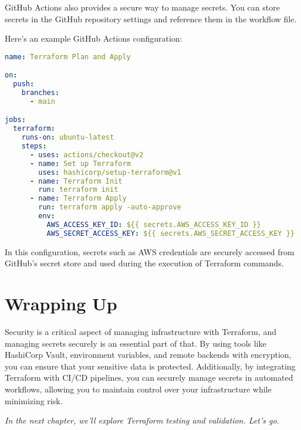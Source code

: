 GitHub Actions also provides a secure way to manage secrets. You can store secrets in the GitHub repository settings and reference them in the workflow file.

Here's an example GitHub Actions configuration:

\begin{lstlisting}[language=yaml]
name: Terraform Plan and Apply

on:
  push:
    branches:
      - main

jobs:
  terraform:
    runs-on: ubuntu-latest
    steps:
      - uses: actions/checkout@v2
      - name: Set up Terraform
        uses: hashicorp/setup-terraform@v1
      - name: Terraform Init
        run: terraform init
      - name: Terraform Apply
        run: terraform apply -auto-approve
        env:
          AWS_ACCESS_KEY_ID: ${{ secrets.AWS_ACCESS_KEY_ID }}
          AWS_SECRET_ACCESS_KEY: ${{ secrets.AWS_SECRET_ACCESS_KEY }}
\end{lstlisting}

In this configuration, secrets such as AWS credentials are securely accessed from GitHub's secret store and used during the execution of Terraform commands.

\section{Wrapping Up}

Security is a critical aspect of managing infrastructure with Terraform, and managing secrets securely is an essential part of that. By using tools like HashiCorp Vault, environment variables, and remote backends with encryption, you can ensure that your sensitive data is protected. Additionally, by integrating Terraform with CI/CD pipelines, you can securely manage secrets in automated workflows, allowing you to maintain control over your infrastructure while minimizing risk.

\vspace{1em}

\textit{In the next chapter, we'll explore Terraform testing and validation. Let's go.}
